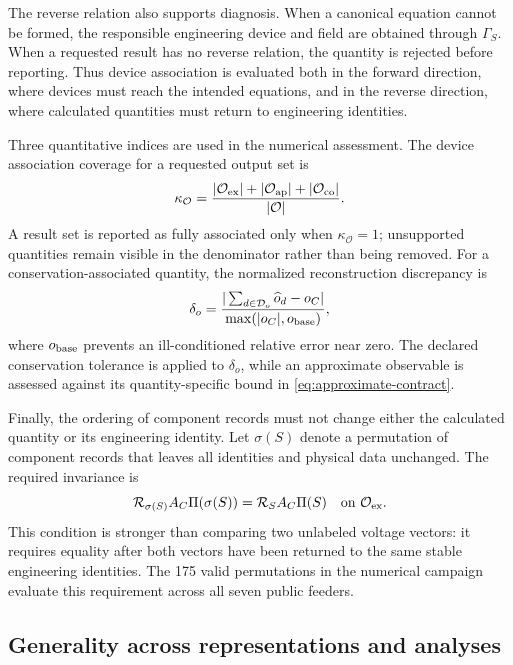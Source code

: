 \documentclass[final,5p,times,twocolumn]{elsarticle}
\newcommand{\Rmap}{\mathcal R}
\newcommand{\Proj}{\Pi}
\begin{document}
The reverse relation also supports diagnosis. When a canonical equation cannot
be formed, the responsible engineering device and field are obtained through
$\Gamma_S$. When a requested result has no reverse relation, the quantity is
rejected before reporting. Thus device association is evaluated both in the
forward direction, where devices must reach the intended equations, and in the
reverse direction, where calculated quantities must return to engineering
identities.

Three quantitative indices are used in the numerical assessment. The device
association coverage for a requested output set is
\begin{equation}
 \kappa_{\mathcal O}=
 \frac{|\mathcal O_{\rm ex}|+|\mathcal O_{\rm ap}|+|\mathcal O_{\rm co}|}
 {|\mathcal O|}.
 \label{eq:association-coverage}
\end{equation}
A result set is reported as fully associated only when
$\kappa_{\mathcal O}=1$; unsupported quantities remain visible in the
denominator rather than being removed. For a conservation-associated
quantity, the normalized reconstruction discrepancy is
\begin{equation}
 \delta_o=\frac{|\sum_{d\in\mathcal D_o}\widehat{o}_d-o_C|}
 {\max(|o_C|,o_{\rm base})},
 \label{eq:reconstruction-error}
\end{equation}
where $o_{\rm base}$ prevents an ill-conditioned relative error near zero. The
declared conservation tolerance is applied to $\delta_o$, while an approximate
observable is assessed against its quantity-specific bound in
\eqref{eq:approximate-contract}.

Finally, the ordering of component records must not change either the calculated
quantity or its engineering identity. Let $\sigma(S)$ denote a permutation of
component records that leaves all identities and physical data unchanged. The required
invariance is
\begin{equation}
 \Rmap_{\sigma(S)}A_C\Proj(\sigma(S))
 =\Rmap_S A_C\Proj(S)
 \quad\text{on }\mathcal O_{\rm ex}.
 \label{eq:permutation-invariance}
\end{equation}
This condition is stronger than comparing two unlabeled voltage vectors: it
requires equality after both vectors have been returned to the same stable
engineering identities. The 175 valid permutations in the numerical campaign
evaluate this requirement across all seven public feeders.

\subsection{Generality across representations and analyses}
\label{sec:generality}
\end{document}
